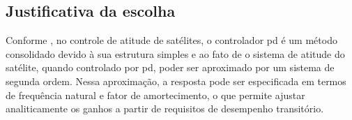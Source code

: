 \subsection{Justificativa da escolha}

Conforme \cite{qi2022variable}, no controle de atitude de satélites, o controlador \gls{pd} é um método consolidado devido à sua estrutura simples e ao fato de o sistema de atitude do satélite, quando controlado por \gls{pd}, poder ser aproximado por um sistema de segunda ordem.
Nessa aproximação, a resposta pode ser especificada em termos de frequência natural e fator de amortecimento, o que permite ajustar analiticamente os ganhos a partir de requisitos de desempenho transitório.
